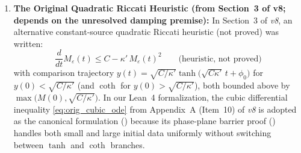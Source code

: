 \documentclass[11pt,a4paper]{article}
\theoremstyle{plain}
\theoremstyle{definition}
\theoremstyle{remark}
\begin{document}
\begin{enumerate}
\item \textbf{The Original Quadratic Riccati Heuristic (from Section~3 of v8; depends on the unresolved damping premise):}
In Section~3 of \emph{v8}, an alternative constant-source quadratic Riccati heuristic (not proved) was written:
\begin{equation}\label{eq:orig_quad_riccati}
\frac{d}{dt}M_\varepsilon(t) \le C - \kappa'\,M_\varepsilon(t)^2\qquad\text{(heuristic, not proved)}
\end{equation}
with comparison trajectory $y(t)=\sqrt{C/\kappa'}\tanh\bigl(\sqrt{C\kappa'}\,t+\phi_0\bigr)$ for $y(0)<\sqrt{C/\kappa'}$ (and $\coth$ for $y(0)>\sqrt{C/\kappa'}$), both bounded above by $\max\bigl(M(0),\sqrt{C/\kappa'}\bigr)$. In our Lean~4 formalization, the cubic differential inequality \eqref{eq:orig_cubic_ode} from Appendix~A (Item~10) of \emph{v8} is adopted as the canonical formulation () because its phase-plane barrier proof () handles both small and large initial data uniformly without switching between $\tanh$ and $\coth$ branches.
\end{enumerate}
\end{document}

